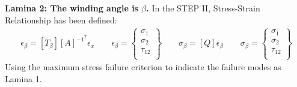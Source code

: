 \documentclass[12pt]{article}
\begin{document}
\noindent \textbf{Lamina 2: The winding angle is $\beta$.}\newline
\noindent In the STEP II, Stress-Strain Relationship has been defined:
\begin{equation}
	\begin{align}
\epsilon_\beta = \left[T_\beta\right]\left[A\right]^{-1}^T\epsilon_x\qquad
\epsilon_\beta=\left\{ \begin{matrix}
    \sigma_1  \\
    \sigma_2  \\
    \tau_{12}  \\
	\end{matrix} \right\}\qquad\sigma_\beta=\left[Q\right]\epsilon_\beta\qquad\sigma_\beta=\left\{ \begin{matrix}
		\sigma_1  \\
		\sigma_2  \\
		\tau_{12}  \\
		\end{matrix} \right\}
	\end{align}
	\end{equation}\newline
\noindent Using the maximum stress failure criterion to indicate the failure modes as Lamina 1.
\end{document}
